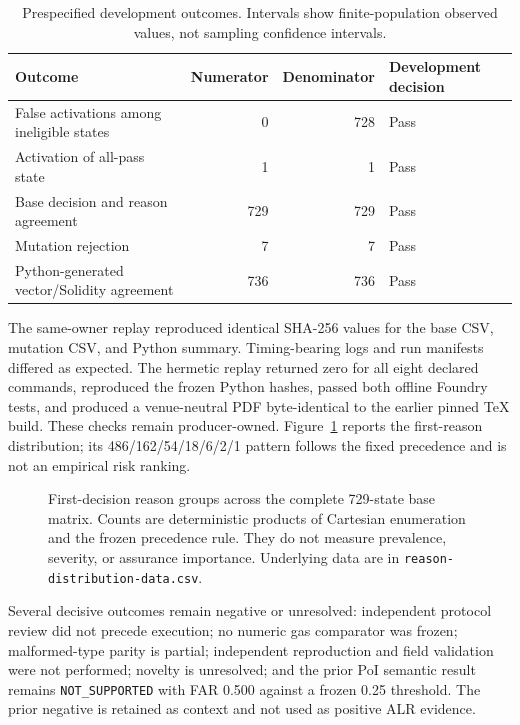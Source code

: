 \documentclass[10pt]{article}
\begin{document}
\begin{table}[t]
\centering
\caption{Prespecified development outcomes. Intervals show finite-population observed
values, not sampling confidence intervals.}
\label{tab:results}
\small
\begin{tabularx}{\linewidth}{@{}Yrrl@{}}
\toprule
Outcome & Numerator & Denominator & Development decision \\
\midrule
False activations among ineligible states & 0 & 728 & Pass \\
Activation of all-pass state & 1 & 1 & Pass \\
Base decision and reason agreement & 729 & 729 & Pass \\
Mutation rejection & 7 & 7 & Pass \\
Python-generated vector/Solidity agreement & 736 & 736 & Pass \\
\bottomrule
\end{tabularx}
\end{table}

The same-owner replay reproduced identical SHA-256 values for the base CSV, mutation
CSV, and Python summary. Timing-bearing logs and run manifests differed as expected.
The hermetic replay returned zero for all eight declared commands, reproduced the
frozen Python hashes, passed both offline Foundry tests, and produced a venue-neutral
PDF byte-identical to the earlier pinned TeX build. These checks remain producer-owned.
Figure~\ref{fig:reasons} reports the first-reason distribution; its
486/162/54/18/6/2/1 pattern follows the fixed precedence and is not an empirical risk
ranking.

\begin{figure}[t]
\centering
\resizebox{0.94\linewidth}{!}{}
\caption{First-decision reason groups across the complete 729-state base matrix.
Counts are deterministic products of Cartesian enumeration and the frozen precedence
rule. They do not measure prevalence, severity, or assurance importance. Underlying
data are in \texttt{reason-distribution-data.csv}.}
\label{fig:reasons}
\end{figure}

Several decisive outcomes remain negative or unresolved: independent protocol review
did not precede execution; no numeric gas comparator was frozen; malformed-type parity
is partial; independent reproduction and field validation were not performed; novelty
is unresolved; and the prior PoI semantic result remains \texttt{NOT\_SUPPORTED}
with FAR 0.500 against a frozen 0.25 threshold. The prior negative is retained as
context and not used as positive ALR evidence.
\end{document}
